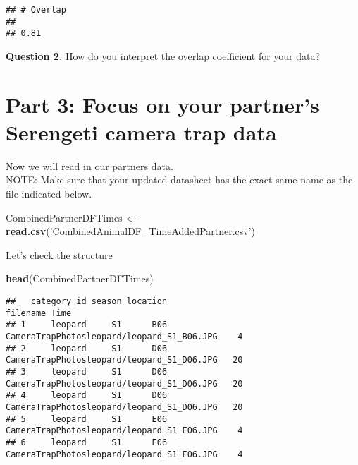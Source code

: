 \documentclass[]{book}
\newenvironment{Shaded}{\begin{snugshade}}{\end{snugshade}}
\newcommand{\KeywordTok}[1]{\textcolor[rgb]{0.13,0.29,0.53}{\textbf{#1}}}
\newcommand{\NormalTok}[1]{#1}
\newcommand{\OperatorTok}[1]{\textcolor[rgb]{0.81,0.36,0.00}{\textbf{#1}}}
\newcommand{\StringTok}[1]{\textcolor[rgb]{0.31,0.60,0.02}{#1}}
\begin{document}
\begin{Shaded}
\end{Shaded}

\begin{verbatim}
## # Overlap
## 
## 0.81
\end{verbatim}

\textbf{Question 2.} How do you interpret the overlap coefficient for your data?

\hypertarget{part-3-focus-on-your-partners-serengeti-camera-trap-data}{%
\section*{Part 3: Focus on your partner's Serengeti camera trap data}\label{part-3-focus-on-your-partners-serengeti-camera-trap-data}}

Now we will read in our partners data.\\
NOTE: Make sure that your updated datasheet has the exact same name as the file indicated below.

\begin{Shaded}
\begin{Highlighting}[]
\NormalTok{CombinedPartnerDFTimes <-}\StringTok{ }\KeywordTok{read.csv}\NormalTok{(}\StringTok{'CombinedAnimalDF_TimeAddedPartner.csv'}\NormalTok{)}
\end{Highlighting}
\end{Shaded}

Let's check the structure

\begin{Shaded}
\begin{Highlighting}[]
\KeywordTok{head}\NormalTok{(CombinedPartnerDFTimes)}
\end{Highlighting}
\end{Shaded}

\begin{verbatim}
##   category_id season location                                   filename Time
## 1     leopard     S1      B06 CameraTrapPhotosleopard/leopard_S1_B06.JPG    4
## 2     leopard     S1      D06 CameraTrapPhotosleopard/leopard_S1_D06.JPG   20
## 3     leopard     S1      D06 CameraTrapPhotosleopard/leopard_S1_D06.JPG   20
## 4     leopard     S1      D06 CameraTrapPhotosleopard/leopard_S1_D06.JPG   20
## 5     leopard     S1      E06 CameraTrapPhotosleopard/leopard_S1_E06.JPG    4
## 6     leopard     S1      E06 CameraTrapPhotosleopard/leopard_S1_E06.JPG    4
\end{verbatim}
\end{document}
